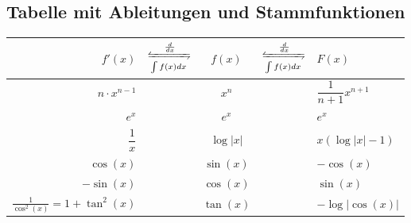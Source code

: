 
\begin{multicols*}{3}
    \subsection{Tabelle mit Ableitungen und Stammfunktionen}

    \begin{center}
        \renewcommand{\arraystretch}{1.75}
        \begin{tabular} {r c c c l} \toprule
            $f'(x)$                               & \hspace*{-10pt}
            $\xleftrightharpoons[\int f(x) dx]{\frac{d}{dx}}$
            \hspace*{-10pt}                       & $f(x)$          & \hspace*{-10pt}
            $\xleftrightharpoons[\int f(x) dx]{\frac{d}{dx}}$
            \hspace*{-10pt}                       & $F(x)$                                                                                \\
            \midrule
            $n \cdot x^{n - 1}$                   & \hspace*{-20pt} & $x^n$              & \hspace*{-20pt} & $\dfrac{1}{n + 1} x^{n + 1}$ \\
            $e^x$                                 & \hspace*{-20pt} & $e^x$              & \hspace*{-20pt} & $e^x$                        \\
            $\dfrac{1}{x}$                        & \hspace*{-20pt} & $\log|x|$          & \hspace*{-20pt} & $x (\log|x| - 1)$            \\
            \midrule
            $\cos(x)$                             & \hspace*{-20pt} & $\sin(x)$          & \hspace*{-20pt} & $-\cos(x)$                   \\
            $-\sin(x)$                            & \hspace*{-20pt} & $\cos(x)$          & \hspace*{-20pt} & $\sin(x)$                    \\
            $\frac{1}{\cos^2(x)} = 1 + \tan^2(x)$ & \hspace*{-20pt} & $\tan(x)$          & \hspace*{-20pt} & $-\log|\cos(x)|$             \\

\end{tabular}
\end{center}
\end{multicols*}
